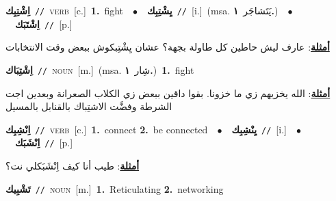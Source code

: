 \documentclass[10pt,a4paper,twoside]{article} %
\begin{document}
\begin{multicols}{2}
{{{{{{{{{{{\setlength\topsep{0pt}\textbf{\foreignlanguage{arabic}{اِشْتِبِك}}\ {\color{gray}\texttt{//}\color{black}}\ \textsc{verb}\ [c.]\ \textbf{1.}~fight\ \ $\bullet$\ \ \setlength\topsep{0pt}\textbf{\foreignlanguage{arabic}{يِشْتِبِك}}\ {\color{gray}\texttt{//}\color{black}}\ [i.]\ \color{gray}(msa. \foreignlanguage{arabic}{يَتَشاجَر}~\foreignlanguage{arabic}{\textbf{١.}})\color{black}\ \ $\bullet$\ \ \setlength\topsep{0pt}\textbf{\foreignlanguage{arabic}{اِشْتَبَك}}\ {\color{gray}\texttt{//}\color{black}}\ [p.]\  \begin{flushright}\color{gray}\foreignlanguage{arabic}{\textbf{\underline{\foreignlanguage{arabic}{أمثلة}}}: عارف ليش حاطين كل طاولة بجهة؟ عشان يِشْتِبكوش ببعض وقت الانتخابات}\end{flushright}\color{black}} \vspace{2mm}

{\setlength\topsep{0pt}\textbf{\foreignlanguage{arabic}{اِشْتِبَاك}}\ {\color{gray}\texttt{//}\color{black}}\ \textsc{noun}\ [m.]\ \color{gray}(msa. \foreignlanguage{arabic}{شِار}~\foreignlanguage{arabic}{\textbf{١.}})\color{black}\ \textbf{1.}~fight\  \begin{flushright}\color{gray}\foreignlanguage{arabic}{\textbf{\underline{\foreignlanguage{arabic}{أمثلة}}}: الله يخزيهم زي ما خزونا. بقوا داقين ببعض زي الكلاب الصعرانة وبعدين اجت الشرطة وفضَّت الاشتِباك بالقنابل بالمسيل}\end{flushright}\color{black}} \vspace{2mm}

{\setlength\topsep{0pt}\textbf{\foreignlanguage{arabic}{اِنْشِبِك}}\ {\color{gray}\texttt{//}\color{black}}\ \textsc{verb}\ [c.]\ \textbf{1.}~connect  \textbf{2.}~be connected\ \ $\bullet$\ \ \setlength\topsep{0pt}\textbf{\foreignlanguage{arabic}{يِنْشِبِك}}\ {\color{gray}\texttt{//}\color{black}}\ [i.]\ \ $\bullet$\ \ \setlength\topsep{0pt}\textbf{\foreignlanguage{arabic}{اِنْشَبَك}}\ {\color{gray}\texttt{//}\color{black}}\ [p.]\  \begin{flushright}\color{gray}\foreignlanguage{arabic}{\textbf{\underline{\foreignlanguage{arabic}{أمثلة}}}: طيب أنا كيف اِنْشَبَكلي نت؟}\end{flushright}\color{black}} \vspace{2mm}

{\setlength\topsep{0pt}\textbf{\foreignlanguage{arabic}{تَشْبِيك}}\ {\color{gray}\texttt{//}\color{black}}\ \textsc{noun}\ [m.]\ \textbf{1.}~Reticulating  \textbf{2.}~networking\ 

}}}}}}}}}}}
\end{multicols}
\end{document}
